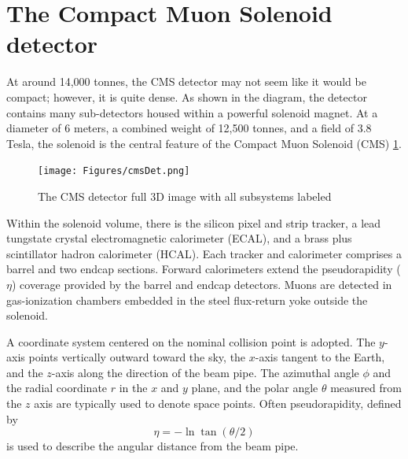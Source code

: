 \section{The Compact Muon Solenoid detector}
At around 14,000 tonnes, the CMS detector may not seem like it would be compact; however, it is quite dense. 
As shown in the diagram, the detector contains many sub-detectors housed within a powerful solenoid magnet. At a diameter of 6 meters, a combined weight of 12,500 tonnes, and a field of 3.8 Tesla, the solenoid is the central feature of the Compact Muon Solenoid (CMS) \ref{fig:cmsdet}.
\begin{figure}[!htb]
\begin{center}
\texttt{[image: Figures/cmsDet.png]}
\caption{\label{fig:cmsdet}The CMS detector full 3D image with all subsystems labeled}
\end{center}
\end{figure}
 Within the solenoid volume, there is the
silicon pixel and strip tracker, a lead tungstate crystal 
electromagnetic calorimeter (ECAL), and a brass plus scintillator 
hadron calorimeter (HCAL). Each tracker and calorimeter comprises a barrel and two endcap 
sections. Forward calorimeters extend the pseudorapidity ($\eta$)
coverage provided by the barrel and endcap detectors. 
Muons are detected in gas-ionization chambers embedded 
in the steel flux-return yoke outside the solenoid.

A coordinate system centered on the nominal collision point is adopted. 
The $y$-axis points vertically outward toward the sky, the $x$-axis tangent to the Earth, and the $z$-axis along the direction of the beam pipe. The azimuthal angle $\phi$ and the radial coordinate $r$ in the $x$ and $y$ plane, and the polar angle $\theta$ measured from the $z$ axis are typically used to denote space points. 
Often pseudorapidity, defined by
\begin{equation}\eta = - \ln \tan(\theta/2)\end{equation}  
 is used to describe the angular distance from the beam pipe. 



